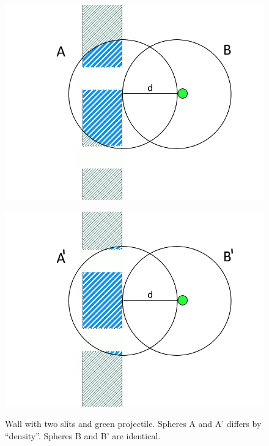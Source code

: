 \documentclass[12pt, a4paper, twocolumn]{article}
\newcommand{\githubPics}{https://raw.githubusercontent.com/artamono1/druhg/master/papers/druhg/}
\begin{document}
\begin{figure}[!htb]
  \begin{minipage}[c]{0.40\linewidth}
    \href{\githubPics pdn_double_slit1a.png}{\includegraphics[width=\linewidth]{pdn_double_slit1a.png}}
  \end{minipage}\hfill
  \begin{minipage}[c]{0.40\linewidth}
    \href{\githubPics pdn_double_slit1b.png}{\includegraphics[width=\linewidth]{pdn_double_slit1b.png}}
  \end{minipage}
  \caption{Wall with two slits and green projectile. Spheres A and A' differs by “density”. Spheres B and B' are identical.} \label{fig:DoubleSlit}
\end{figure}
\end{document}

